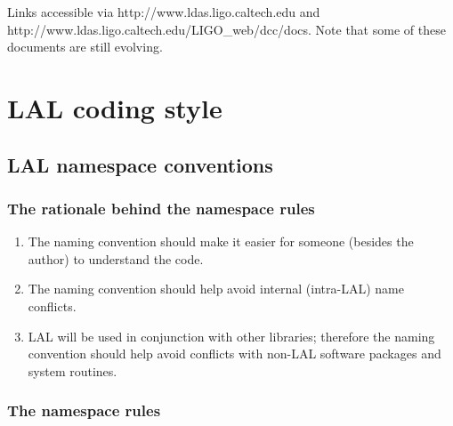 \documentclass[]{ligodcc}
\begin{document}
\begin{table}
Links accessible via http://www.ldas.ligo.caltech.edu and \\
http://www.ldas.ligo.caltech.edu/LIGO\_web/dcc/docs. Note that
some of these documents are still evolving.
\end{table}


\section{LAL coding style}
\label{sec:codingstyle}

\subsection{LAL namespace conventions}

\subsubsection{The rationale behind the namespace rules}

\begin{enumerate}
\item
The naming convention should make  it easier for someone
(besides the author) to understand the code.

\item
The naming convention should help avoid  internal (intra-LAL)
name conflicts.

\item
LAL will be used in conjunction with other libraries;
therefore the naming convention should help avoid conflicts with
non-LAL software packages and system routines.

\end{enumerate}

\subsubsection{The namespace rules}
\end{document}
